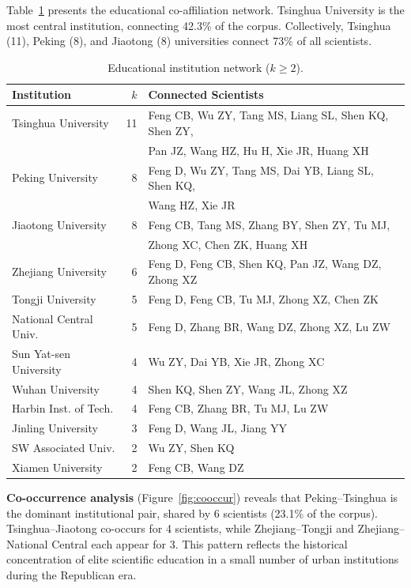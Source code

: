 \documentclass[review]{elsarticle}
\begin{document}
Table~\ref{tab:network} presents the educational co-affiliation network. Tsinghua University is the most central institution, connecting 42.3\% of the corpus. Collectively, Tsinghua (11), Peking (8), and Jiaotong (8) universities connect 73\% of all scientists.

\begin{table}[ht]
\centering
\caption{Educational institution network ($k \geq 2$).}
\label{tab:network}
\begin{tabular}{lrl}
\toprule
Institution & $k$ & Connected Scientists \\
\midrule
Tsinghua University & 11 & Feng CB, Wu ZY, Tang MS, Liang SL, Shen KQ, Shen ZY, \\
& & Pan JZ, Wang HZ, Hu H, Xie JR, Huang XH \\
Peking University & 8 & Feng D, Wu ZY, Tang MS, Dai YB, Liang SL, Shen KQ, \\
& & Wang HZ, Xie JR \\
Jiaotong University & 8 & Feng CB, Tang MS, Zhang BY, Shen ZY, Tu MJ, \\
& & Zhong XC, Chen ZK, Huang XH \\
Zhejiang University & 6 & Feng D, Feng CB, Shen KQ, Pan JZ, Wang DZ, Zhong XZ \\
Tongji University & 5 & Feng D, Feng CB, Tu MJ, Zhong XZ, Chen ZK \\
National Central Univ. & 5 & Feng D, Zhang BR, Wang DZ, Zhong XZ, Lu ZW \\
Sun Yat-sen University & 4 & Wu ZY, Dai YB, Xie JR, Zhong XC \\
Wuhan University & 4 & Shen KQ, Shen ZY, Wang JL, Zhong XZ \\
Harbin Inst. of Tech. & 4 & Feng CB, Zhang BR, Tu MJ, Lu ZW \\
Jinling University & 3 & Feng D, Wang JL, Jiang YY \\
SW Associated Univ. & 2 & Wu ZY, Shen KQ \\
Xiamen University & 2 & Feng CB, Wang DZ \\
\bottomrule
\end{tabular}
\end{table}

\textbf{Co-occurrence analysis} (Figure~\ref{fig:cooccur}) reveals that Peking--Tsinghua is the dominant institutional pair, shared by 6 scientists (23.1\% of the corpus). Tsinghua--Jiaotong co-occurs for 4 scientists, while Zhejiang--Tongji and Zhejiang--National Central each appear for 3. This pattern reflects the historical concentration of elite scientific education in a small number of urban institutions during the Republican era.
\end{document}
